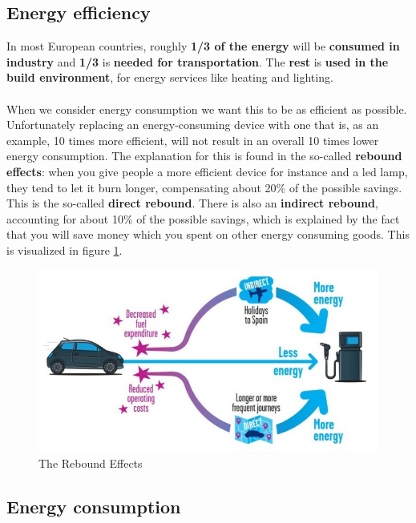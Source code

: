 \documentclass[../summary.tex]{subfiles}
\begin{document}
	\subsection{Energy efficiency}
	
	In most European countries, roughly \textbf{1/3 of the energy} will be \textbf{consumed in industry} and \textbf{1/3} is \textbf{needed for transportation}. The \textbf{rest} is \textbf{used in the build environment}, for energy services like heating and lighting. 
	\\\\
	When we consider energy consumption we want this to be as efficient as possible. Unfortunately replacing an energy-consuming device with one that is, as an example, 10 times more efficient, will not result in an overall 10 times lower energy consumption. The explanation for this is found in the so-called \textbf{rebound effects}: when you give people a more efficient device for instance and a led lamp, they tend to let it burn longer, compensating about 20\% of the possible savings. This is the so-called \textbf{direct rebound}. There is also an \textbf{indirect rebound}, accounting for about 10\% of the possible savings, which is explained by the fact that you will save money which you spent on other energy consuming goods.  This is visualized in figure \ref{fig:rebound-effects}.
	
	\begin{figure}[H]
	\centering
	\includegraphics[width=0.7\linewidth]{../images/4-rebound-effects}
	\caption{The Rebound Effects}
	\label{fig:rebound-effects}
\end{figure}
	
	\subsection{Energy consumption}
	
\end{document}
